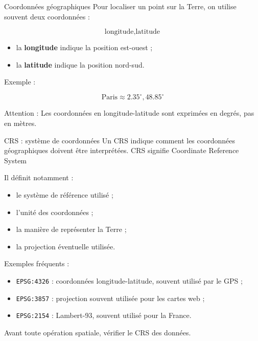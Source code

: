 \documentclass[
  10pt,
  ignorenonframetext,
]{beamer}
\begin{document}
\begin{frame}{Coordonnées géographiques}
\label{coordonnuxe9es-guxe9ographiques}
Pour localiser un point sur la Terre, on utilise souvent deux
coordonnées :

\[
\text{longitude}, \text{latitude}
\]

\begin{itemize}
  \item la \textbf{longitude} indique la position est-ouest ;
  \item la \textbf{latitude} indique la position nord-sud.
\end{itemize}

Exemple :

\[
\text{Paris} \approx 2.35^\circ, 48.85^\circ
\]

Attention : Les coordonnées en longitude-latitude sont exprimées en
degrés, pas en mètres.
\end{frame}

\begin{frame}{CRS : système de coordonnées}
\label{crs-systuxe8me-de-coordonnuxe9es}
Un CRS indique comment les coordonnées géographiques doivent être
interprétées. CRS signifie Coordinate Reference System

Il définit notamment :

\begin{itemize}
  \item le système de référence utilisé ;
  \item l’unité des coordonnées ;
  \item la manière de représenter la Terre ;
  \item la projection éventuelle utilisée.
\end{itemize}

Exemples fréquents :

\begin{itemize}
  \item \texttt{EPSG:4326} : coordonnées longitude-latitude, souvent utilisé par le GPS ;
  \item \texttt{EPSG:3857} : projection souvent utilisée pour les cartes web ;
  \item \texttt{EPSG:2154} : Lambert-93, souvent utilisé pour la France.
\end{itemize}

Avant toute opération spatiale, vérifier le CRS des données.
\end{frame}
\end{document}
